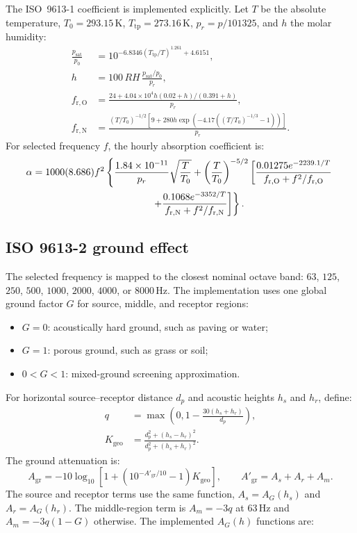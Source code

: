 \documentclass[11pt,a4paper]{article}
\newcommand{\unit}[1]{\,\mathrm{#1}}
\begin{document}
The ISO~9613-1 coefficient is implemented explicitly. Let $T$ be the absolute
temperature, $T_0=293.15\unit{K}$, $T_{\mathrm{tp}}=273.16\unit{K}$,
$p_r=p/101325$, and $h$ the molar humidity:
\begin{align}
  \frac{p_{\mathrm{sat}}}{p_0}
    &= 10^{-6.8346(T_{\mathrm{tp}}/T)^{1.261}+4.6151}, \\
  h &= 100\,RH\,\frac{p_{\mathrm{sat}}/p_0}{p_r}, \\
  f_{\mathrm{r,O}} &=
    \frac{24+4.04\times10^4 h(0.02+h)/(0.391+h)}{p_r}, \\
  f_{\mathrm{r,N}} &=
    \frac{(T/T_0)^{-1/2}
    \left[9+280h\exp\left(-4.17((T/T_0)^{-1/3}-1)\right)\right]}{p_r}.
\end{align}
For selected frequency $f$, the hourly absorption coefficient is:
\begin{align}
 \alpha ={}& 1000(8.686)f^2
 \left\{
 \frac{1.84\times10^{-11}}{p_r}\sqrt{\frac{T}{T_0}}
 + \left(\frac{T}{T_0}\right)^{-5/2}
 \left[
 \frac{0.01275e^{-2239.1/T}}
      {f_{\mathrm{r,O}}+f^2/f_{\mathrm{r,O}}}
 \right.\right. \nonumber\\
 &\left.\left.\hspace{38mm}
 + \frac{0.1068e^{-3352/T}}
      {f_{\mathrm{r,N}}+f^2/f_{\mathrm{r,N}}}
 \right]
 \right\}.
 \label{eq:noise-alpha}
\end{align}

\subsection{ISO 9613-2 ground effect}

The selected frequency is mapped to the closest nominal octave band:
$63$, $125$, $250$, $500$, $1000$, $2000$, $4000$, or $8000\unit{Hz}$.
The implementation uses one global ground factor $G$ for source, middle, and
receptor regions:
\begin{itemize}
  \item $G=0$: acoustically hard ground, such as paving or water;
  \item $G=1$: porous ground, such as grass or soil;
  \item $0<G<1$: mixed-ground screening approximation.
\end{itemize}

For horizontal source--receptor distance $d_p$ and acoustic heights $h_s$ and
$h_r$, define:
\begin{align}
  q &= \max\left(0,1-\frac{30(h_s+h_r)}{d_p}\right), \\
  K_{\mathrm{geo}} &=
  \frac{d_p^2+(h_s-h_r)^2}{d_p^2+(h_s+h_r)^2}.
\end{align}
The ground attenuation is:
\begin{equation}
  A_{\mathrm{gr}} =
  -10\log_{10}\left[
    1 + \left(10^{-A'_{\mathrm{gr}}/10}-1\right)K_{\mathrm{geo}}
  \right],
  \qquad
  A'_{\mathrm{gr}}=A_s+A_r+A_m.
  \label{eq:noise-ground}
\end{equation}
The source and receptor terms use the same function,
$A_s=A_G(h_s)$ and $A_r=A_G(h_r)$. The middle-region term is
$A_m=-3q$ at $63\unit{Hz}$ and $A_m=-3q(1-G)$ otherwise. The implemented
$A_G(h)$ functions are:
\end{document}
